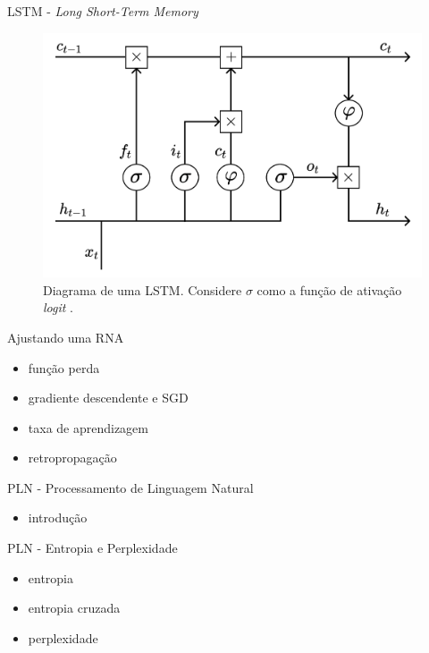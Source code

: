 \documentclass{beamer}
\begin{document}
    \begin{frame}{LSTM - \textit{Long Short-Term Memory}}
       \begin{figure}
            \centering
            \includegraphics[scale=0.25]{figuras/lstm_cell.pdf}
	        \caption{Diagrama de uma LSTM. Considere $\sigma$ como a função de ativação \textit{logit} \citep[adaptado de][]{kamath2019}.}
        \end{figure}
    \end{frame}

    \begin{frame}{Ajustando uma RNA}
        \begin{itemize}
            \item função perda
            \item gradiente descendente e SGD
            \item taxa de aprendizagem
            \item retropropagação
        \end{itemize}
    \end{frame}

    \begin{frame}{PLN - Processamento de Linguagem Natural}
        \begin{itemize}
            \item introdução
        \end{itemize}
    \end{frame}

    \begin{frame}{PLN - Entropia e Perplexidade}
        \begin{itemize}
            \item entropia
            \item entropia cruzada
            \item perplexidade
        \end{itemize}
    \end{frame}
\end{document}
